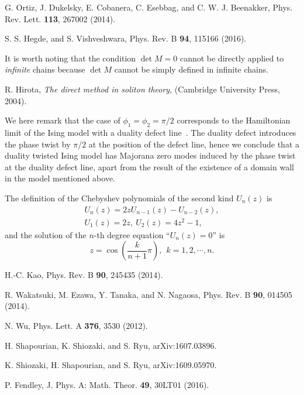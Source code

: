 \documentclass[aps, prb, showpacs, twocolumn, %
amssymb,superscriptaddress]{revtex4}
\begin{document}
\begin{thebibliography}{}
G. Ortiz, J. Dukelsky, E. Cobanera, C. Esebbag, and C. W. J. Beenakker, Phys. Rev. Lett. {\bf 113}, 267002 (2014).

S. S. Hegde, and S. Vishveshwara, Phys. Rev. B {\bf 94}, 115166 (2016).

It is worth noting that the condition $\det M = 0$ cannot be directly applied to \textit{infinite} chains because $\det M$ cannot be simply defined in infinite chains.

R. Hirota, {\it The direct method in soliton theory}, (Cambridge University Press, 2004).

We here remark that the case of $\phi_{1} = \phi_{2} = \pi/2$ corresponds to the Hamiltonian limit of the Ising model with a duality defect line~\cite{Aasen-16}. The duality defect introduces the phase twist by $\pi/2$ at the position of the defect line, hence we conclude that a duality twisted Ising model has Majorana zero modes induced by the phase twist at the duality defect line, apart from the result of the existence of a domain wall in the model mentioned above.

The definition of the Chebyshev polynomials of the second kind $U_{n} \left( z \right)$ is
\begin{eqnarray*}
U_{n} \left( z \right) = 2 z U_{n-1} \left( z \right) - U_{n-2} \left( z \right), \\
U_{1} \left( z \right) = 2z,~U_{2} \left( z \right) = 4z^{2} - 1,
\end{eqnarray*}
and the solution of the $n$-th degree equation ``$U_{n} \left( z \right) = 0$'' is
\begin{equation*}
z = \cos \left( \frac{k}{n+1} \pi \right),~~k=1,2,\cdots,n .
\end{equation*}

H.-C. Kao, Phys. Rev. B {\bf 90}, 245435 (2014).

R. Wakatsuki, M. Ezawa, Y. Tanaka, and N. Nagaosa, Phys. Rev. B {\bf 90}, 014505 (2014).

N. Wu, Phys. Lett. A {\bf 376}, 3530 (2012).

H. Shapourian, K. Shiozaki, and S. Ryu, arXiv:1607.03896.

K. Shiozaki, H. Shapourian, and S. Ryu, arXiv:1609.05970.

P. Fendley, J. Phys. A: Math. Theor. {\bf 49}, 30LT01 (2016).

\end{thebibliography}
\end{document}
